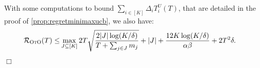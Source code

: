 With some computations to bound $\sum_{i \in [K]}\Delta_i T^U_i(T)$, that are detailed in  the proof of \cref{prop:regretminimaxucb},  we also have:
\begin{align*}
   \mathcal{R}_\textsc{OtO}(T)\leq&
   \max_{J\subseteq [K]}2T\sqrt{\frac{2|J|\log(K/\delta)}{T+\sum_{j\in J}m_j}}+|J|+\frac{12 K\log(K/\delta)}{\alpha \beta}+2T^2\delta.
\end{align*}

\hfill \( \Box\) 



 